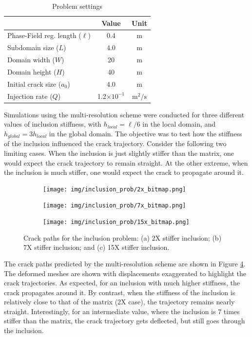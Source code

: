 \begin{table}[ht]
\centering
\caption{Problem settings}
\begin{tabular}[t]{lcc}
\hline
&Value &Unit \\
\hline
Phase-Field reg. length ($\ell$)&0.4&m\\
Subdomain size ($L$) &4.0&m\\
Domain width ($W$) &20&$\text{m}$\\
Domain height ($H$) &40&$\text{m}$\\
Initial crack size ($a_0$) &4.0&$\text{m}$\\
Injection rate ($Q$)&1.2$\times10^{-1}$&$\text{m}^2/\text{s}$\\
\hline
\end{tabular}
\label{geometry_inclusion}
\end{table}%

Simulations using the multi-resolution scheme were conducted for three different values of inclusion stiffness, with $h_{local} = \ell/6$ in the local domain, and $h_{global} = 3h_{local}$ in the global domain. The objective was to test how the stiffness of the inclusion influenced the crack trajectory. Consider the following two limiting cases.  When the inclusion is just slightly stiffer than the matrix, one would expect the crack trajectory to remain straight. At the other extreme, when the inclusion is much stiffer, one would expect the crack to propagate around it.  

\begin{figure}[!htbp]
\begin{subfigure}{.33\textwidth}
  \centering
  \texttt{[image: img/inclusion\_prob/2x\_bitmap.png]}
  \caption{}
  \label{fig:result_2x_inc}
\end{subfigure}%
\begin{subfigure}{.33\textwidth}
  \centering
  \texttt{[image: img/inclusion\_prob/7x\_bitmap.png]}
  \caption{}
  \label{fig:result_7x_inc}
\end{subfigure}%
\begin{subfigure}{.33\textwidth}
  \centering
  \texttt{[image: img/inclusion\_prob/15x\_bitmap.png]}
  \caption{}
  \label{fig:result_15x_inc}
\end{subfigure}
  \caption{Crack paths for the inclusion problem: (a) 2X stiffer inclusion; (b) 7X stiffer inclusion; and (c) 15X stiffer inclusion. } 
  \label{fig:inclusion_paths}
\end{figure}

The crack paths predicted by the multi-resolution scheme are shown in Figure \ref{fig:inclusion_paths}. The deformed meshes are shown with displacements exaggerated to highlight the crack trajectories. As expected, for an inclusion with much higher stiffness, the crack propagates around it. By contrast, when the stiffness of the inclusion is relatively close to that of the matrix (2X case), the trajectory remains nearly straight. Interestingly, for an intermediate value, where the inclusion is 7 times stiffer than the matrix, the crack trajectory gets deflected, but still goes through the inclusion.  

